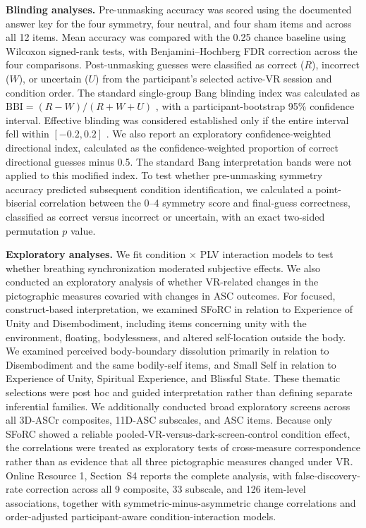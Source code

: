 \documentclass[pdflatex,sn-basic,lineno]{sn-jnl}
\begin{document}
\medskip\noindent\textbf{Blinding analyses.} Pre-unmasking accuracy was scored using the documented answer key for the four symmetry, four neutral, and four sham items and across all 12 items. Mean accuracy was compared with the 0.25 chance baseline using Wilcoxon signed-rank tests, with Benjamini--Hochberg FDR correction across the four comparisons. Post-unmasking guesses were classified as correct ($R$), incorrect ($W$), or uncertain ($U$) from the participant's selected active-VR session and condition order. The standard single-group Bang blinding index was calculated as $\mathrm{BBI}=(R-W)/(R+W+U)$ \citep{Bang2004,Kolahi2009}, with a participant-bootstrap 95\% confidence interval. Effective blinding was considered established only if the entire interval fell within $[-0.2,0.2]$ \citep{Qin2024,Kolahi2009}. We also report an exploratory confidence-weighted directional index, calculated as the confidence-weighted proportion of correct directional guesses minus 0.5. The standard Bang interpretation bands were not applied to this modified index. To test whether pre-unmasking symmetry accuracy predicted subsequent condition identification, we calculated a point-biserial correlation between the 0--4 symmetry score and final-guess correctness, classified as correct versus incorrect or uncertain, with an exact two-sided permutation $p$ value.

\medskip\noindent\textbf{Exploratory analyses.} We fit condition $\times$ PLV interaction models to test whether breathing synchronization moderated subjective effects. We also conducted an exploratory analysis of whether VR-related changes in the pictographic measures covaried with changes in ASC outcomes. For focused, construct-based interpretation, we examined SFoRC in relation to Experience of Unity and Disembodiment, including items concerning unity with the environment, floating, bodylessness, and altered self-location outside the body. We examined perceived body-boundary dissolution primarily in relation to Disembodiment and the same bodily-self items, and Small Self in relation to Experience of Unity, Spiritual Experience, and Blissful State. These thematic selections were post hoc and guided interpretation rather than defining separate inferential families. We additionally conducted broad exploratory screens across all 3D-ASCr composites, 11D-ASC subscales, and ASC items. Because only SFoRC showed a reliable pooled-VR-versus-dark-screen-control condition effect, the correlations were treated as exploratory tests of cross-measure correspondence rather than as evidence that all three pictographic measures changed under VR. Online Resource 1, Section~S4 reports the complete analysis, with false-discovery-rate correction across all 9 composite, 33 subscale, and 126 item-level associations, together with symmetric-minus-asymmetric change correlations and order-adjusted participant-aware condition-interaction models.
\end{document}
